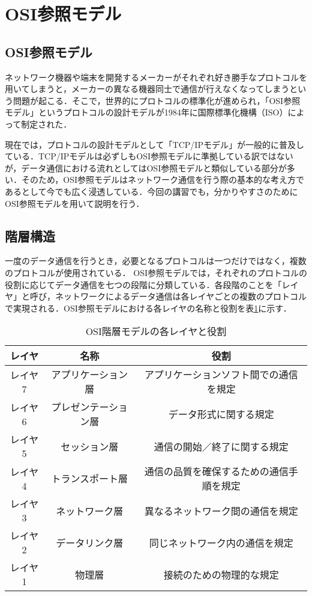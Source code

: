 \section{OSI参照モデル}

\subsection{OSI参照モデル}
	ネットワーク機器や端末を開発するメーカーがそれぞれ好き勝手なプロトコルを用いてしまうと，メーカーの異なる機器同士で通信が行えなくなってしまうという問題が起こる．そこで，世界的にプロトコルの標準化が進められ，「OSI参照モデル」というプロトコルの設計モデルが1984年に国際標準化機構（ISO）によって制定された．
	
	現在では，プロトコルの設計モデルとして「TCP/IPモデル」が一般的に普及している．TCP/IPモデルは必ずしもOSI参照モデルに準拠している訳ではないが，データ通信における流れとしてはOSI参照モデルと類似している部分が多い．そのため，OSI参照モデルはネットワーク通信を行う際の基本的な考え方であるとして今でも広く浸透している．今回の講習でも，分かりやすさのためにOSI参照モデルを用いて説明を行う．


\subsection{階層構造}
	一度のデータ通信を行うとき，必要となるプロトコルは一つだけではなく，複数のプロトコルが使用されている．
	OSI参照モデルでは，それぞれのプロトコルの役割に応じてデータ通信を七つの段階に分類している．各段階のことを「レイヤ」と呼び，ネットワークによるデータ通信は各レイヤごとの複数のプロトコルで実現される．OSI参照モデルにおける各レイヤの名称と役割を表\ref{tab:osi}に示す．

	\begin{table}[htb]
		\begin{center}
			\caption{OSI階層モデルの各レイヤと役割}
			\begin{tabular}{|c|c|c|} \hline
				レイヤ & 名称 & 役割 \\ \hline
				レイヤ7 & アプリケーション層 & アプリケーションソフト間での通信を規定 \\ 
				レイヤ6 & プレゼンテーション層 & データ形式に関する規定 \\
				レイヤ5 & セッション層 & 通信の開始／終了に関する規定 \\
				レイヤ4 & トランスポート層 & 通信の品質を確保するための通信手順を規定 \\
				レイヤ3 & ネットワーク層 & 異なるネットワーク間の通信を規定 \\
				レイヤ2 & データリンク層 & 同じネットワーク内の通信を規定 \\
				レイヤ1 & 物理層 & 接続のための物理的な規定 \\ \hline
			\end{tabular}
			\label{tab:osi}
		\end{center}
	\end{table}

